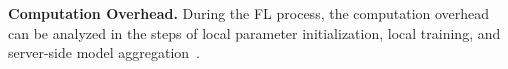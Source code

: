 \documentclass{article} %
\begin{document}
\noindent\textbf{Computation Overhead.}
During the FL process, the computation overhead can be analyzed in the steps of local parameter initialization, local training, and server-side model aggregation~\cite{wu2022node,zhou2022exact}. 
%
%
%
%
\end{document}
